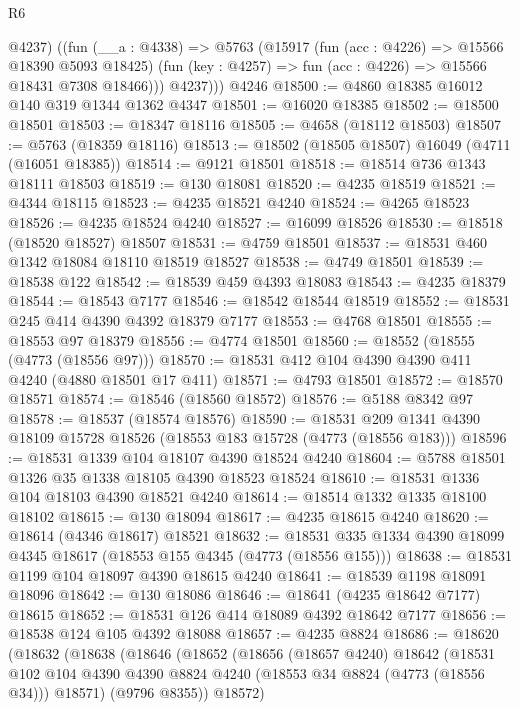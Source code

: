\begin{lexlean}{R6}
\begin{coremodule}
          @4237)
        ((fun (__a : @4338) =>
        @5763
          (@15917
            (fun (acc : @4226) => @15566 @18390 @5093 @18425)
            (fun (key : @4257) => fun (acc : @4226) => @15566 @18431 @7308 @18466)))
          @4237)))
    @4246
@18500 := @4860 @18385 @16012 @140 @319 @1344 @1362 @4347
@18501 := @16020 @18385
@18502 := @18500 @18501
@18503 := @18347 @18116
@18505 := @4658 (@18112 @18503)
@18507 := @5763 (@18359 @18116)
@18513 := @18502 (@18505 @18507) @16049 (@4711 (@16051 @18385))
@18514 := @9121 @18501
@18518 := @18514 @736 @1343 @18111 @18503
@18519 := @130 @18081
@18520 := @4235 @18519
@18521 := @4344 @18115
@18523 := @4235 @18521 @4240
@18524 := @4265 @18523
@18526 := @4235 @18524 @4240
@18527 := @16099 @18526
@18530 := @18518 (@18520 @18527) @18507
@18531 := @4759 @18501
@18537 := @18531 @460 @1342 @18084 @18110 @18519 @18527
@18538 := @4749 @18501
@18539 := @18538 @122
@18542 := @18539 @459 @4393 @18083
@18543 := @4235 @18379
@18544 := @18543 @7177
@18546 := @18542 @18544 @18519
@18552 := @18531 @245 @414 @4390 @4392 @18379 @7177
@18553 := @4768 @18501
@18555 := @18553 @97 @18379
@18556 := @4774 @18501
@18560 := @18552 (@18555 (@4773 (@18556 @97)))
@18570 := @18531 @412 @104 @4390 @4390 @411 @4240 (@4880 @18501 @17 @411)
@18571 := @4793 @18501
@18572 := @18570 @18571
@18574 := @18546 (@18560 @18572)
@18576 := @5188 @8342 @97
@18578 := @18537 (@18574 @18576)
@18590 := @18531 @209 @1341 @4390 @18109 @15728 @18526 (@18553 @183 @15728 (@4773 (@18556 @183)))
@18596 := @18531 @1339 @104 @18107 @4390 @18524 @4240
@18604 := @5788 @18501 @1326 @35 @1338 @18105 @4390 @18523 @18524
@18610 := @18531 @1336 @104 @18103 @4390 @18521 @4240
@18614 := @18514 @1332 @1335 @18100 @18102
@18615 := @130 @18094
@18617 := @4235 @18615 @4240
@18620 := @18614 (@4346 @18617) @18521
@18632 := @18531 @335 @1334 @4390 @18099 @4345 @18617 (@18553 @155 @4345 (@4773 (@18556 @155)))
@18638 := @18531 @1199 @104 @18097 @4390 @18615 @4240
@18641 := @18539 @1198 @18091 @18096
@18642 := @130 @18086
@18646 := @18641 (@4235 @18642 @7177) @18615
@18652 := @18531 @126 @414 @18089 @4392 @18642 @7177
@18656 := @18538 @124 @105 @4392 @18088
@18657 := @4235 @8824
@18686 := @18620
    (@18632
      (@18638
        (@18646
          (@18652
            (@18656
              (@18657 @4240)
              @18642
              (@18531
                @102
                @104
                @4390
                @4390
                @8824
                @4240
                (@18553 @34 @8824 (@4773 (@18556 @34)))
                @18571)
              (@9796 @8355))
            @18572)

\end{coremodule}
\end{lexlean}
